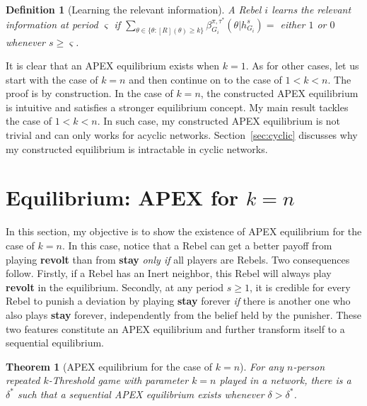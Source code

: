 \documentclass[12pt,letter]{article}
\newtheorem{theorem}{Theorem}
\newtheorem{definition}{Definition}[section]
\theoremstyle{definition}
\theoremstyle{remark}
\theoremstyle{claim}
\begin{document}
\begin{definition}[Learning the relevant information]\label{def_learn}
A Rebel $i$ learns the relevant information at period $\varsigma$ if $\sum_{\theta\in\{\theta:[R](\theta)\geq k\}}\beta^{\pi,\tau^*}_{G_i}(\theta|h^{s}_{G_i})=$ either $1$ or $0$ whenever $s\geq \varsigma$.
\end{definition}

It is clear that an APEX equilibrium exists when $k=1$. As for other cases, let us start with the case of $k=n$ and then continue on to the case of $1<k<n$. The proof is by construction. In the case of $k=n$, the constructed APEX equilibrium is intuitive and satisfies a stronger equilibrium concept. My main result tackles the case of $1<k<n$. In such case, my constructed APEX equilibrium is not trivial and can only works for acyclic networks. Section~\ref{sec:cyclic} discusses why my constructed equilibrium is intractable in cyclic networks.

\section{Equilibrium: APEX for $k=n$}
\label{sec:equilibrium_1}

In this section, my objective is to show the existence of APEX equilibrium for the case of $k=n$. In this case, notice that a Rebel can get a better payoff from playing \textbf{revolt} than from \textbf{stay} \textit{only if} all players are Rebels. Two consequences follow. Firstly, if a Rebel has an Inert neighbor, this Rebel will always play \textbf{revolt} in the equilibrium. Secondly, at any period $s\geq 1$, it is credible for every Rebel to punish a deviation by playing \textbf{stay} forever \textit{if} there is another one who also plays \textbf{stay} forever, independently from the belief held by the punisher. These two features constitute an APEX equilibrium and further transform itself to a sequential equilibrium. 

\begin{theorem}[APEX equilibrium for the case of $k=n$]
\label{thm_minor_thm}
For any $n$-person repeated $k$-Threshold game with parameter $k=n$ played in a network, there is a $\delta^{*}$ such that a sequential APEX equilibrium exists whenever $\delta >
\delta^{*}$.
\end{theorem}
\end{document}
